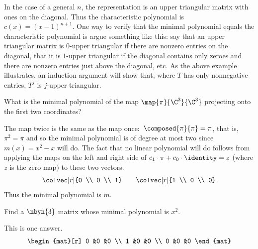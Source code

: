 \begin{exercises}
\begin{answer}
      In the case of a general $n$, the representation is an upper
      triangular matrix with ones on the diagonal.
      Thus the characteristic polynomial is $c(x)=(x-1)^{n+1}$.
      One way to verify that the minimal polynomial equals the 
      characteristic polynomial is argue something like this:
      say that an upper triangular matrix is $0$-upper triangular if
      there are nonzero entries on the diagonal, that it is $1$-upper 
      triangular if the diagonal contains only zeroes and there are nonzero
      entries just above the diagonal, etc.
      As the above example illustrates, an induction argument will 
      show that, where $T$ has only nonnegative entries, 
      $T^j$ is $j$-upper triangular.
    \end{answer}
   \item 
     What is the minimal polynomial of
     the map \( \map{\pi}{\C^3}{\C^3} \)
     projecting onto the first two coordinates?
      \begin{answer}
        The map twice is the same as the map once:~$\composed{\pi}{\pi}=\pi$,
        that is, $\pi^2=\pi$ and so the minimal polynomial is of degree
        at most two since \( m(x)=x^2-x \) will do.
        The fact that no linear polynomial will do follows from applying
        the maps on the left and right side of 
        $c_1\cdot \pi+c_0\cdot \identity=z$ (where $z$ is the zero map)
        to these two vectors.
        \begin{equation*}
          \colvec[r]{0 \\ 0 \\ 1}
          \qquad
          \colvec[r]{1 \\ 0 \\ 0}
        \end{equation*}
        Thus the minimal polynomial is $m$.
      \end{answer}
   \item 
     Find a \( \nbyn{3} \) matrix whose minimal
     polynomial is \( x^2 \).
     \begin{answer}
        This is one answer.
        \begin{equation*}
            \begin{mat}[r]
              0  &0  &0  \\
              1  &0  &0  \\
              0  &0  &0
            \end{mat}
        \end{equation*} 

\end{answer}
\end{exercises}
